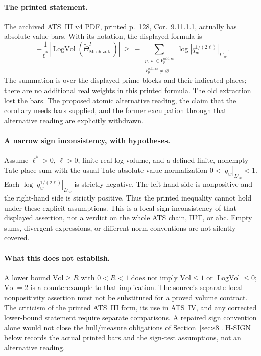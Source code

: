 \documentclass[11pt,a4paper]{article}
\theoremstyle{definition}
\theoremstyle{remark}
\begin{document}
\paragraph{The printed statement.}
The archived ATS~III v4 PDF, printed p.~128, Cor.~9.11.1.1, actually has
absolute-value bars. With its notation, the displayed formula is
\[
 -\frac{1}{\ell^*}
 \left|\operatorname{LogVol}(\widetilde\Theta^{I}_{\mathrm{Mochizuki}})\right|
 \ \ge\ -\!
 \sum_{\substack{p,\ w\in V_p^{\mathrm{odd,ss}}\\
                  V_p^{\mathrm{odd,ss}}\ne\varnothing}}
 \log\left|q_w^{1/(2\ell)}\right|_{L'_w}.
\]
The summation is over the displayed prime blocks and their indicated
places; there are no additional real weights in this printed formula.
The old extraction lost the bars. The proposed atomic alternative
reading, the claim that the corollary needs bars supplied, and the former
exculpation through that alternative reading are explicitly withdrawn.

\paragraph{A narrow sign inconsistency, with hypotheses.}
Assume $\ell^*>0$, $\ell>0$, finite real log-volume, and a defined finite,
nonempty Tate-place sum with the usual Tate absolute-value normalization
$0<|q_w|_{L'_w}<1$. Each
$\log|q_w^{1/(2\ell)}|_{L'_w}$ is strictly negative. The left-hand side is
nonpositive and the right-hand side is strictly positive. Thus the printed
inequality cannot hold under these explicit assumptions. This is a local
sign inconsistency of that displayed assertion, not a verdict on the
whole ATS chain, IUT, or abc. Empty sums, divergent expressions, or
different norm conventions are not silently covered.

\paragraph{What this does not establish.}
A lower bound $\mathrm{Vol}\ge R$ with $0<R<1$ does not imply
$\mathrm{Vol}\le1$ or $\operatorname{LogVol}\le0$; $\mathrm{Vol}=2$ is a
counterexample to that implication. The source's separate local
nonpositivity assertion must not be substituted for a proved volume
contract. The criticism of the printed ATS~III form, its use in ATS~IV,
and any corrected lower-bound statement require separate comparisons.
A repaired sign convention alone would not close the hull/measure
obligations of Section~\ref{sec:s8}. H-SIGN below records the actual
printed bars and the sign-test assumptions, not an alternative reading.
\end{document}
